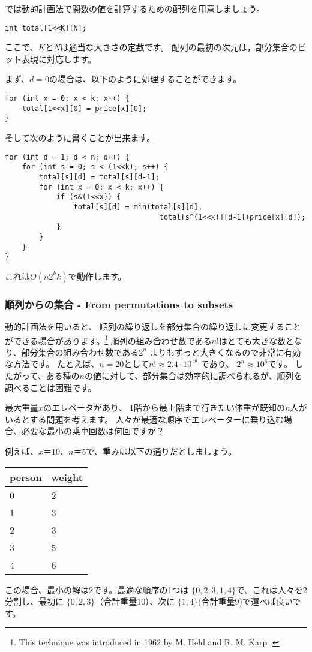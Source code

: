 では動的計画法で関数の値を計算するための配列を用意しましょう。
\begin{lstlisting}
int total[1<<K][N];
\end{lstlisting}
ここで、$K$と$N$は適当な大きさの定数です。
配列の最初の次元は，部分集合のビット表現に対応します。

まず、$d=0$の場合は、以下のように処理することができます。
\begin{lstlisting}
for (int x = 0; x < k; x++) {
    total[1<<x][0] = price[x][0];
}
\end{lstlisting}
そして次のように書くことが出来ます。
\begin{lstlisting}
for (int d = 1; d < n; d++) {
    for (int s = 0; s < (1<<k); s++) {
        total[s][d] = total[s][d-1];
        for (int x = 0; x < k; x++) {
            if (s&(1<<x)) {
                total[s][d] = min(total[s][d],
                                    total[s^(1<<x)][d-1]+price[x][d]);
            }
        }
    }
}
\end{lstlisting}
これは$O(n 2^k k)$で動作します。

\subsubsection{順列からの集合 - From permutations to subsets}

動的計画法を用いると、
順列の繰り返しを部分集合の繰り返しに変更することができる場合があります。\footnote{This technique was introduced in 1962
by M. Held and R. M. Karp \cite{hel62}.}
順列の組み合わせ数である$n!$はとても大きな数となり、部分集合の組み合わせ数である$2^n$ よりもずっと大きくなるので非常に有効な方法です。
たとえば、$n = 20$として$n! \approx 2.4 \cdot 10^{18}$ であり、 $2^n \approx 10^6$です。
したがって、ある種の$n$の値に対して、部分集合は効率的に調べられるが、順列を調べることは困難です。

最大重量$x$のエレベータがあり、
1階から最上階まで行きたい体重が既知の$n$人がいるとする問題を考えます。
人々が最適な順序でエレベーターに乗り込む場合、必要な最小の乗車回数は何回ですか？

例えば、$x＝10$、$n＝5$で、重みは以下の通りだとしましょう。
\begin{center}
\begin{tabular}{ll}
person & weight \\
\hline
0 & 2 \\
1 & 3 \\
2 & 3 \\
3 & 5 \\
4 & 6 \\
\end{tabular}
\end{center}
この場合、最小の解は2です。最適な順序の1つは
$\{0,2,3,1,4\}$で、これは人々を2分割し、最初に
$\{0,2,3\}$（合計重量10）、次に
$\{1,4\}$(合計重量9)で運べば良いです。

